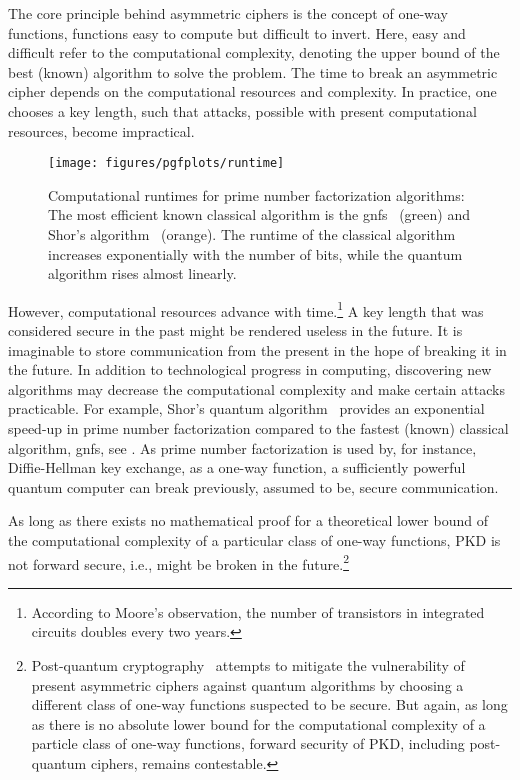 The core principle behind asymmetric ciphers is the concept of one-way functions, functions easy to compute but difficult to invert.
Here, easy and difficult refer to the computational complexity, denoting the upper bound of the best (known) algorithm to solve the problem.
The time to break an asymmetric cipher depends on the computational resources and complexity.
In practice, one chooses a key length, such that attacks, possible with present computational resources, become impractical.
\begin{figure}[htb]
	\centering
	\texttt{[image: figures/pgfplots/runtime]}
	\caption{Computational runtimes for prime number factorization algorithms: The most efficient known classical algorithm is the \gls{gnfs}~\cite{Lenstra1993} (green) and Shor's algorithm~\cite{Shor1994} (orange). The runtime of the classical algorithm increases exponentially with the number of bits, while the quantum algorithm rises almost linearly.}
	\label{fig:prime_number_factorization_runtime}
\end{figure}
However, computational resources advance with time.\footnote{According to Moore's observation, the number of transistors in integrated circuits doubles every two years.}
A key length that was considered secure in the past might be rendered useless in the future.
It is imaginable to store communication from the present in the hope of breaking it in the future.
In addition to technological progress in computing, discovering new algorithms may decrease the computational complexity and make certain attacks practicable.
For example, Shor's quantum algorithm~\cite{Shor1994} provides an exponential speed-up in prime number factorization compared to the fastest (known) classical algorithm, \gls{gnfs}, see .
As prime number factorization is used by, for instance, Diffie-Hellman key exchange, as a one-way function, a sufficiently powerful quantum computer can break previously, assumed to be, secure communication.

As long as there exists no mathematical proof for a theoretical lower bound of the computational complexity of a particular class of one-way functions, PKD is not forward secure, i.e., might be broken in the future.\footnote{Post-quantum cryptography~\cite{Bernstein2017,Chen2016} attempts to mitigate the vulnerability of present asymmetric ciphers against quantum algorithms by choosing a different class of one-way functions suspected to be secure. But again, as long as there is no absolute lower bound for the computational complexity of a particle class of one-way functions, forward security of PKD, including post-quantum ciphers, remains contestable.}


